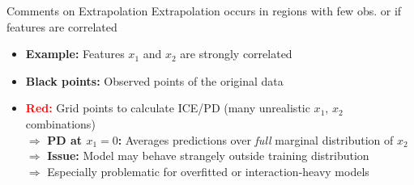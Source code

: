 \documentclass[10pt,compress,t,notes=noshow, xcolor=table]{beamer}
\begin{document}
\begin{frame}{Comments on Extrapolation}
Extrapolation occurs in regions with few obs. or if features are correlated
\begin{itemize}
\item \textbf{Example:} Features $x_1$ and $x_2$ are strongly correlated
\item \textbf{Black points:} Observed points of the original data
\item \textbf{\textcolor{red}{Red:}} Grid points to calculate ICE/PD (many unrealistic $x_1$, $x_2$ combinations)\\ %
$\Rightarrow$ %
\textbf{PD at $x_1=0$:} Averages predictions over \textit{full} marginal distribution of $x_2$\\
$\Rightarrow$ \textbf{Issue:} Model may behave strangely outside training distribution\\
$\Rightarrow$ Especially problematic for overfitted or interaction-heavy models 
\end{itemize}

%
%
%
%
\end{frame}
\end{document}

